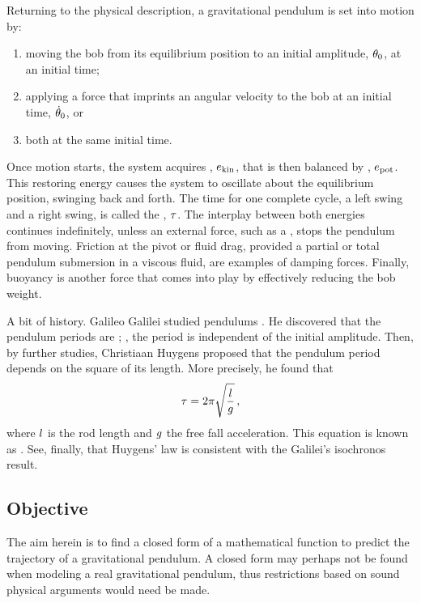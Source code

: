 Returning to the physical description, a gravitational pendulum is set into motion by:
\begin{enumerate}
\item moving the bob from its equilibrium position to an initial amplitude, $\theta_0$, at an initial time;
\item applying a force that imprints an angular velocity to the bob at an initial time, $\dot{\theta}_0$, or
\item both at the same initial time.
\end{enumerate}

Once motion starts, the system acquires , $e_\text{kin}$, that is then balanced by , $e_\text{pot}$. This restoring energy causes the system to oscillate about the equilibrium position, swinging back and forth. The time for one complete cycle, a left swing and a right swing, is called the , $\tau$. The interplay between both energies continues indefinitely, unless an external force, such as a , stops the pendulum from moving. Friction at the pivot or fluid drag, provided a partial or total pendulum submersion in a viscous fluid, are examples of damping forces. Finally, buoyancy is another force that comes into play by effectively reducing the bob weight.

A bit of history. Galileo Galilei studied pendulums . He discovered that the pendulum periods are ; \ie, the period is independent of the initial amplitude. Then, by further studies, Christiaan Huygens proposed that the pendulum period depends on the square of its length. More precisely, he found that
\begin{equation}\label{eq:huygenslawfortheperiod}
\tau = 2\pi\sqrt{\dfrac{l}{g}}\,,
\end{equation}
where $l$ is the rod length and $g$ the free fall acceleration. This equation is known as . See, finally, that Huygens' law is consistent with the Galilei's isochronos result.


\subsection{Objective}
The aim herein is to find a closed form of a mathematical function to predict the trajectory of a gravitational pendulum. A closed form may perhaps not be found when modeling a real gravitational pendulum, thus restrictions based on sound physical arguments would need be made.
